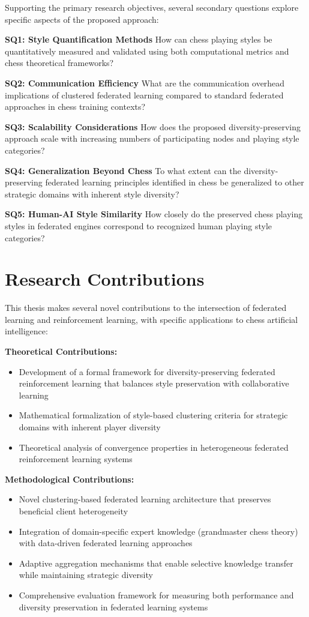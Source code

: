 Supporting the primary research objectives, several secondary questions explore specific aspects of the proposed approach:

\textbf{SQ1: Style Quantification Methods}
How can chess playing styles be quantitatively measured and validated using both computational metrics and chess theoretical frameworks?

\textbf{SQ2: Communication Efficiency}
What are the communication overhead implications of clustered federated learning compared to standard federated approaches in chess training contexts?

\textbf{SQ3: Scalability Considerations}
How does the proposed diversity-preserving approach scale with increasing numbers of participating nodes and playing style categories?

\textbf{SQ4: Generalization Beyond Chess}
To what extent can the diversity-preserving federated learning principles identified in chess be generalized to other strategic domains with inherent style diversity?

\textbf{SQ5: Human-AI Style Similarity}
How closely do the preserved chess playing styles in federated engines correspond to recognized human playing style categories?

\section{Research Contributions}
\label{sec:contributions}

This thesis makes several novel contributions to the intersection of federated learning and reinforcement learning, with specific applications to chess artificial intelligence:

\textbf{Theoretical Contributions:}
\begin{itemize}
\item Development of a formal framework for diversity-preserving federated reinforcement learning that balances style preservation with collaborative learning
\item Mathematical formalization of style-based clustering criteria for strategic domains with inherent player diversity
\item Theoretical analysis of convergence properties in heterogeneous federated reinforcement learning systems
\end{itemize}

\textbf{Methodological Contributions:}
\begin{itemize}
\item Novel clustering-based federated learning architecture that preserves beneficial client heterogeneity
\item Integration of domain-specific expert knowledge (grandmaster chess theory) with data-driven federated learning approaches
\item Adaptive aggregation mechanisms that enable selective knowledge transfer while maintaining strategic diversity
\item Comprehensive evaluation framework for measuring both performance and diversity preservation in federated learning systems
\end{itemize}

